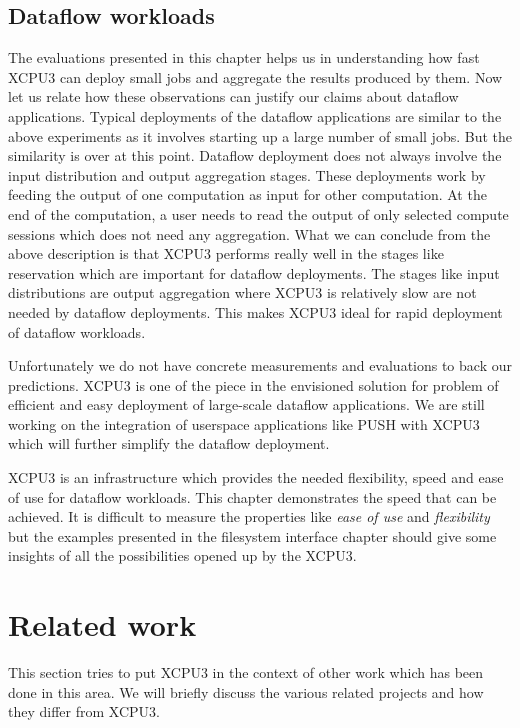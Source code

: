 \documentclass[conference]{IEEEtran}
\begin{document}
\subsection{Dataflow workloads}
The evaluations presented in this chapter helps us in understanding how fast
XCPU3 can deploy small jobs and aggregate the results produced by them.  Now
let us relate how these observations can justify our claims about dataflow
applications. Typical deployments of the dataflow applications are similar to
the above experiments as it involves starting up a large number of small jobs.
But the similarity is over at this point. Dataflow deployment does not always
involve the input distribution and output aggregation stages.  These deployments
work by feeding the output of one computation as input for other computation. 
At the end of the computation, a user needs to read the output of only selected
compute sessions which does not need any aggregation.  What we can conclude from
the above description is that XCPU3 performs really well in the stages like
reservation which are important for dataflow deployments.  The stages like input
distributions are output aggregation where XCPU3 is relatively slow are not
needed by dataflow deployments.  This makes XCPU3 ideal for rapid deployment of
dataflow workloads.

Unfortunately we do not have concrete measurements and evaluations to back our
predictions.  XCPU3 is one of the piece in the envisioned solution for problem
of efficient and easy deployment of large-scale dataflow applications.   We are
still working on the integration of userspace applications like
PUSH\cite{PODC:Push} with XCPU3 which will further simplify the dataflow
deployment.


XCPU3 is an infrastructure which provides the needed flexibility, speed and 
ease of use for dataflow workloads.  This chapter demonstrates the speed that
can be achieved.  It is difficult to measure the properties like \textit{ease of
use} and \textit{flexibility} but the examples presented in the filesystem
interface chapter should give some insights of all the possibilities opened up
by the XCPU3.


\section{Related work}


This section tries to put XCPU3 in the context of other work which 
has been done in this area.  We will briefly discuss the various related
projects and how they differ from XCPU3.
\end{document}
